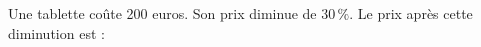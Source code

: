 
Une tablette coûte 200 euros. Son prix diminue de $30\,\%$. Le prix après cette diminution est :

\smallskip


